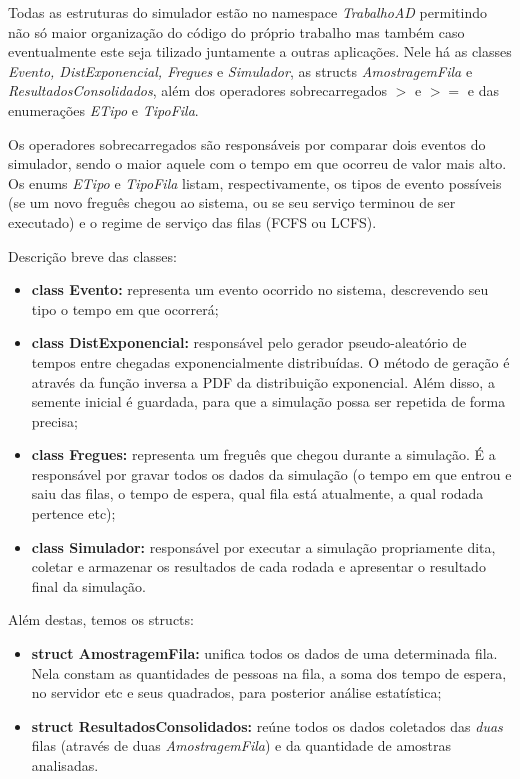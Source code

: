 \documentclass[a4paper,10pt]{article}
\begin{document}
    Todas as estruturas do simulador estão no namespace \emph{TrabalhoAD} permitindo não só maior organização do código do próprio trabalho mas também caso eventualmente este seja tilizado juntamente a outras aplicações. Nele há as classes \emph{Evento, DistExponencial, Fregues} e \emph{Simulador}, as structs \emph{AmostragemFila} e \emph{ResultadosConsolidados}, além dos operadores sobrecarregados \emph{$>$} e \emph{$>=$} e das enumerações \emph{ETipo} e \emph{TipoFila}.

    Os operadores sobrecarregados são responsáveis por comparar dois eventos do simulador, sendo o maior aquele com o tempo em que ocorreu de valor mais alto. Os enums \emph{ETipo} e \emph{TipoFila} listam, respectivamente, os tipos de evento possíveis (se um novo freguês chegou ao sistema, ou se seu serviço terminou de ser executado) e o regime de serviço das filas (FCFS ou LCFS).

    Descrição breve das classes:

\begin {itemize}
\item \textbf{class Evento:} representa um evento ocorrido no sistema, descrevendo seu tipo o tempo em que ocorrerá;

\item \textbf{class DistExponencial:} responsável pelo gerador pseudo-aleatório de tempos entre chegadas exponencialmente distribuídas. O método de geração é através da função inversa a PDF da distribuição exponencial. Além disso, a semente inicial é guardada, para que a simulação possa ser repetida de forma precisa;

\item \textbf{class Fregues:} representa um freguês que chegou durante a simulação. É a responsável por gravar todos os dados da simulação (o tempo em que entrou e saiu das filas, o tempo de espera, qual fila está atualmente, a qual rodada pertence etc);

\item \textbf{class Simulador:} responsável por executar a simulação propriamente dita, coletar e armazenar os resultados de cada rodada e apresentar o resultado final da simulação.
\end {itemize}

    Além destas, temos os structs:

\begin {itemize}
\item \textbf{struct AmostragemFila:} unifica todos os dados de uma determinada fila. Nela constam as quantidades de pessoas na fila, a soma dos tempo de espera, no servidor etc e seus quadrados, para posterior análise estatística;

\item \textbf{struct ResultadosConsolidados:} reúne todos os dados coletados das \emph{duas} filas (através de duas \emph{AmostragemFila}) e da quantidade de amostras analisadas.
\end {itemize}
\end{document}
